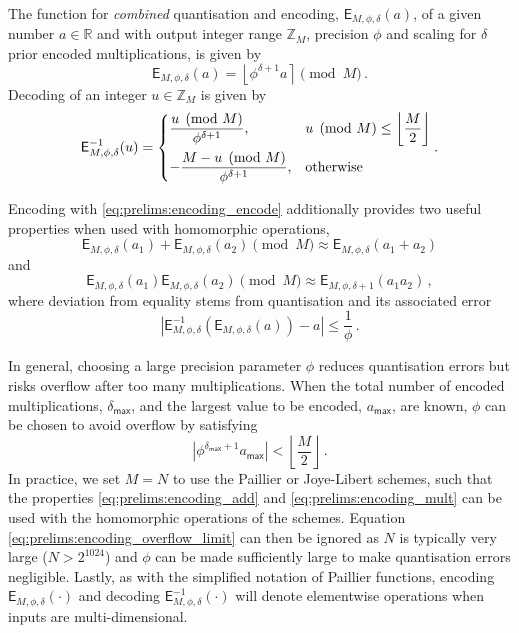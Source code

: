 The function for \textit{combined} quantisation and encoding, $\mathsf{E}_{M,\phi,\delta}(a)$, of a given number $a \in \mathbb{R}$ and with output integer range $\mathbb{Z}_M$, precision $\phi$ and scaling for $\delta$ prior encoded multiplications, is given by
\begin{equation}\label{eq:prelims:encoding_encode}
    \mathsf{E}_{M,\phi,\delta}(a) = \left\lfloor \phi^{\delta+1} a \right\rceil \pmod{M}\,.
\end{equation}
Decoding of an integer $u \in \mathbb{Z}_M$ is given by
\begin{equation}\label{eq:prelims:encoding_decode}
    \mathsf{E}^{-1}_{M,\phi,\delta}(u)=
    \begin{dcases}
        \frac{u \pmod{M}}{\phi^{\delta+1}}, & u \pmod{M} \leq \left\lfloor\frac{M}{2}\right\rfloor \\
        -\frac{M - u \pmod{M}}{\phi^{\delta+1}}, & \text{otherwise}
    \end{dcases}.
\end{equation}

Encoding with \eqref{eq:prelims:encoding_encode} additionally provides two useful properties when used with homomorphic operations,
\begin{equation}\label{eq:prelims:encoding_add}
    \mathsf{E}_{M,\phi,\delta}(a_1) + \mathsf{E}_{M,\phi,\delta}(a_2) \pmod{M} \approx \mathsf{E}_{M,\phi,\delta}(a_1+a_2)
\end{equation}
and
\begin{equation}\label{eq:prelims:encoding_mult}
        \mathsf{E}_{M,\phi,\delta}(a_1)\mathsf{E}_{M,\phi,\delta}(a_2) \pmod{M} \approx \mathsf{E}_{M,\phi,\delta+1}(a_1a_2)\,,
\end{equation}
where deviation from equality stems from quantisation and its associated error
\begin{equation}
    \left|\mathsf{E}^{-1}_{M,\phi,\delta}\left(\mathsf{E}_{M,\phi,\delta}(a)\right) - a\right| \leq \frac{1}{\phi}\,.
\end{equation}

In general, choosing a large precision parameter $\phi$ reduces quantisation errors but risks overflow after too many multiplications. When the total number of encoded multiplications, $\delta_{\mathsf{max}}$, and the largest value to be encoded, $a_{\mathsf{max}}$, are known, $\phi$ can be chosen to avoid overflow by satisfying
\begin{equation}\label{eq:prelims:encoding_overflow_limit}
    \left|\phi^{\delta_{\mathsf{max}}+1}a_{\mathsf{max}}\right| < \left\lfloor \frac{M}{2} \right\rfloor\,.
\end{equation}
In practice, we set $M=N$ to use the Paillier or Joye-Libert schemes, such that the properties \eqref{eq:prelims:encoding_add} and \eqref{eq:prelims:encoding_mult} can be used with the homomorphic operations of the schemes. Equation \eqref{eq:prelims:encoding_overflow_limit} can then be ignored as $N$ is typically very large ($N>2^{1024}$) and $\phi$ can be made sufficiently large to make quantisation errors negligible. Lastly, as with the simplified notation of Paillier functions, encoding $\mathsf{E}_{M,\phi,\delta}(\cdot)$ and decoding $\mathsf{E}^{-1}_{M,\phi,\delta}(\cdot)$ will denote elementwise operations when inputs are multi-dimensional.